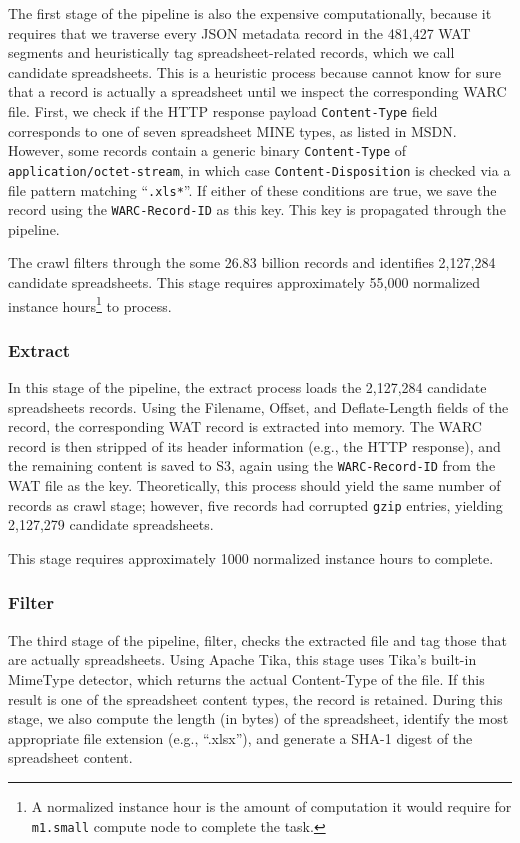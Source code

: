\documentclass[conference]{IEEEtran}
\begin{document}
The first stage of the pipeline is also the expensive computationally, because it requires that we traverse every JSON metadata record in the 481,427 WAT segments and heuristically tag spreadsheet-related records, which we call candidate spreadsheets. This is a heuristic process because cannot know for sure that a record is actually a spreadsheet until we inspect the corresponding WARC file. First, we check if the HTTP response payload \texttt{Content-Type} field corresponds to one of seven spreadsheet MINE types, as listed in MSDN. However, some records contain a generic binary \texttt{Content-Type} of \texttt{application/octet-stream}, in which case \texttt{Content-Disposition} is checked via a file pattern matching ``\texttt{.xls*}''. If either of these conditions are true, we save the record using the \texttt{WARC-Record-ID} as this key. This key is propagated through the pipeline.


The crawl filters through the some 26.83 billion records and identifies 2,127,284 candidate spreadsheets. This stage requires approximately 55,000 normalized instance hours\footnote{A normalized instance hour is the amount of computation it would require for \texttt{m1.small} compute node to complete the task.} to process.

\subsubsection{Extract} 

In this stage of the pipeline, the extract process loads the 2,127,284 candidate spreadsheets records. Using the Filename, Offset, and Deflate-Length fields of the record, the corresponding WAT record is extracted into memory. The WARC record is then stripped of its header information (e.g., the HTTP response), and the remaining content is saved to S3, again using the \texttt{WARC-Record-ID} from the WAT file as the key. Theoretically, this process should yield the same number of records as crawl stage; however, five records had corrupted \texttt{gzip} entries, yielding 2,127,279 candidate spreadsheets.

This stage requires approximately 1000 normalized instance hours to complete.

\subsubsection{Filter} 

The third stage of the pipeline, filter, checks the extracted file and tag those that are actually spreadsheets. Using Apache Tika, this stage uses Tika's built-in MimeType detector, which returns the actual Content-Type of the file. If this result is one of the spreadsheet content types, the record is retained. During this stage, we also compute the length (in bytes) of the spreadsheet, identify the most appropriate file extension (e.g., ``.xlsx''), and generate a SHA-1 digest of the spreadsheet content. 
\end{document}
